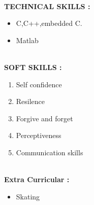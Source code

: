 \documentclass{article}
\begin{document}
	
		
\leavevmode
\\
	\textbf{TECHNICAL SKILLS :}
	\begin{itemize}	
		\item C,C++,embedded C.
		\item Matlab 
	\end{itemize}
		\newpage
		
\leavevmode		\\	
	\textbf{SOFT SKILLS :}
	\begin{enumerate}
	\item Self confidence 
	\item Resilence
	\item Forgive and forget
	\item Perceptiveness
	\item Communication skills 

	\end{enumerate}
	
\leavevmode\\
	\textbf{Extra Curricular :}
	\begin{itemize}
		\item Skating
		
	\end{itemize}
\end{document}
